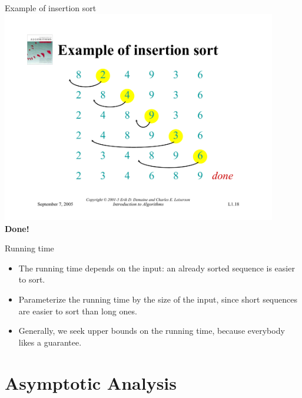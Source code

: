 \documentclass{beamer}
\begin{document}
\begin{frame}{Example of insertion sort}
    \centering
    \includegraphics[width=0.9\textwidth, trim={5cm 2.95cm 5cm 4.25cm}, clip]{pages/lec1_18} \\
    \textbf{Done!}
\end{frame}

\begin{frame}{Running time}
    \begin{itemize}
        \item The running time depends on the input: an already sorted sequence is easier to sort.
        \item Parameterize the running time by the size of the input, since short sequences are easier to sort than long ones.
        \item Generally, we seek upper bounds on the running time, because everybody likes a guarantee.
    \end{itemize}
\end{frame}

\section{Asymptotic Analysis}
\end{document}
